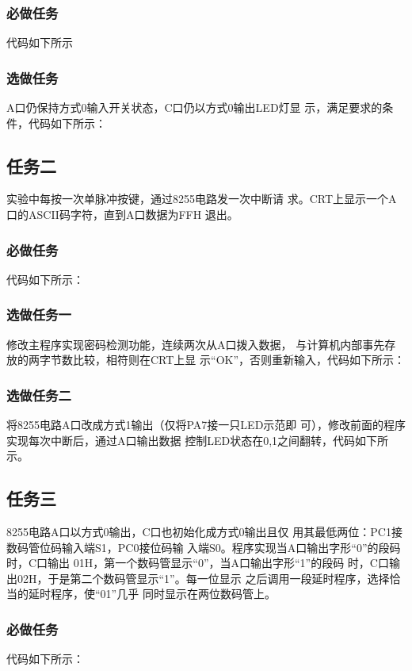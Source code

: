 \documentclass[UTF8,a4paper]{paper}
\begin{document}
\subsubsection{必做任务}
代码如下所示\\ 

\subsubsection{选做任务}
A口仍保持方式0输入开关状态，C口仍以方式0输出LED灯显
示，满足要求的条件，代码如下所示：\\ 

\subsection{任务二}
实验中每按一次单脉冲按键，通过8255电路发一次中断请
求。CRT上显示一个A口的ASCII码字符，直到A口数据为FFH
退出。
\subsubsection{必做任务}
代码如下所示：\\ 

\subsubsection{选做任务一}
修改主程序实现密码检测功能，连续两次从A口拨入数据，
与计算机内部事先存放的两字节数比较，相符则在CRT上显
示“OK”，否则重新输入，代码如下所示：\\ 

\subsubsection{选做任务二}
将8255电路A口改成方式1输出（仅将PA7接一只LED示范即
可），修改前面的程序实现每次中断后，通过A口输出数据
控制LED状态在0,1之间翻转，代码如下所示。\\ 

\subsection{任务三}
8255电路A口以方式0输出，C口也初始化成方式0输出且仅
用其最低两位：PC1接数码管位码输入端S1，PC0接位码输
入端S0。程序实现当A口输出字形“0”的段码时，C口输出
01H，第一个数码管显示“0”，当A口输出字形“1”的段码
时，C口输出02H，于是第二个数码管显示“1”。每一位显示
之后调用一段延时程序，选择恰当的延时程序，使“01”几乎
同时显示在两位数码管上。
\subsubsection{必做任务}
代码如下所示：\\ 

\end{document}
